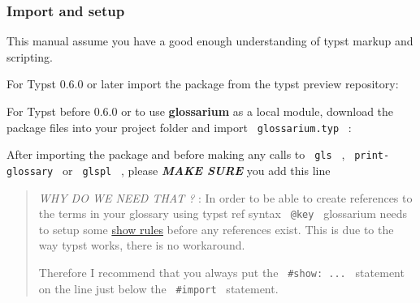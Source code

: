 \subsubsection{Import and setup}\label{import-and-setup}

This manual assume you have a good enough understanding of typst markup
and scripting.

For Typst 0.6.0 or later import the package from the typst preview
repository:

\begin{Shaded}
\begin{Highlighting}[]
\end{Highlighting}
\end{Shaded}

For Typst before 0.6.0 or to use \textbf{glossarium} as a local module,
download the package files into your project folder and import
\texttt{\ glossarium.typ\ } :

\begin{Shaded}
\begin{Highlighting}[]
\end{Highlighting}
\end{Shaded}

After importing the package and before making any calls to
\texttt{\ gls\ } , \texttt{\ print-glossary\ } or \texttt{\ glspl\ } ,
please \emph{\textbf{MAKE SURE}} you add this line

\begin{Shaded}
\begin{Highlighting}[]
\end{Highlighting}
\end{Shaded}

\begin{quote}
\emph{WHY DO WE NEED THAT ?} : In order to be able to create references
to the terms in your glossary using typst ref syntax \texttt{\ @key\ }
glossarium needs to setup some
\href{https://typst.app/docs/tutorial/advanced-styling/}{show rules}
before any references exist. This is due to the way typst works, there
is no workaround.

Therefore I recommend that you always put the \texttt{\ \#show:\ ...\ }
statement on the line just below the \texttt{\ \#import\ } statement.
\end{quote}

